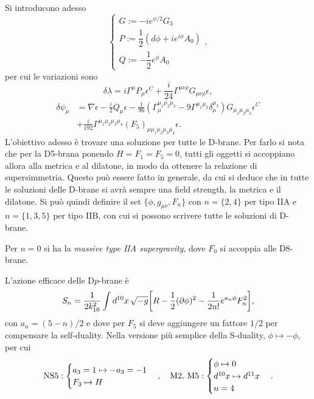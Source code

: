 Si introducono adesso 
\begin{equation}
    \begin{cases}
        G := -ie^{\phi/2}G_3 \\[2ex]
        P := \dfrac{1}{2}(d\phi + ie^{i\phi}A_0) \\[2ex]
        Q := -\dfrac{1}{2}e^{\phi}A_0
    \end{cases},
\end{equation}
per cui le variazioni sono 
\begin{equation}
    \delta \lambda = i\Gamma^\mu P_\mu \epsilon^C + \frac{i}{24}\Gamma^{\mu\nu\rho}G_{\mu\nu\rho}\epsilon,
\end{equation}
\begin{equation}
    \begin{split}
        \delta\psi_\mu &= \nabla\epsilon - \frac{i}{2}Q_\mu\epsilon - \frac{1}{96}(\Gamma^{\mu_1\mu_2\mu_3}_\mu - 9\Gamma^{\mu_1\mu_2}\delta_\mu^{\mu_3})G_{\mu_1\mu_2\mu_3}\epsilon^C \\
        &+ \frac{i}{192}\Gamma^{\mu_1\mu_2\mu_3\mu_4}(F_5)_{\mu\mu_1\mu_2\mu_3\mu_4}\epsilon.
    \end{split}
\end{equation}
L'obiettivo adesso è trovare una soluzione per tutte le D-brane. Per farlo si nota che per la D5-brana ponendo $H = F_1 = F_5 = 0$, tutti gli oggetti si accoppiano allora alla metrica e al dilatone, in modo da ottenere la relazione di supersimmetria. Questo può essere fatto in generale, da cui si deduce che in tutte le soluzioni delle D-brane si avrà sempre una field strength, la metrica e il dilatone. Si può quindi definire il set $\{\phi,g_{\mu\nu},F_n\}$ con $n = \{2,4\}$ per tipo IIA e $n = \{1,3,5\}$ per tipo IIB, con cui si possono scrivere tutte le soluzioni di D-brane. 
\begin{obs}
    Per $n = 0$ si ha la \emph{massive type IIA supergravity}, dove $F_0$ si accoppia alle D8-brane.
\end{obs}
L'azione efficace delle D$p$-brane è 
\begin{equation}
    S_{n} = \frac{1}{2k_{10}^2}\int d^{10}x\,\sqrt{-g}\bigg[R - \frac{1}{2}(\partial\phi)^2 - \frac{1}{2n!}e^{a_n\phi}F_n^2\bigg],
\end{equation}
con $a_n = (5 - n)/2$ e dove per $F_5$ si deve aggiungere un fattore $1/2$ per compensare la self-duality. Nella versione più semplice della S-duality, $\phi \mapsto -\phi$, per cui 
\begin{equation}
    \mathrm{NS5} : 
    \begin{cases}
        a_3 = 1 \mapsto -a_3 = -1 \\
        F_3 \mapsto H
    \end{cases},\quad \mathrm{M2,\,M5} : 
    \begin{cases}
        \phi \mapsto 0 \\
        d^{10}x \mapsto d^{11}x \\
        n = 4
    \end{cases}.
\end{equation}
